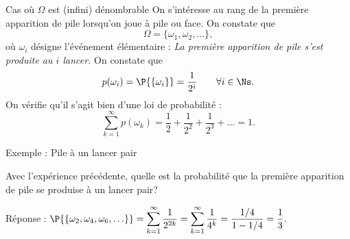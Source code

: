 \documentclass[nuit,charter,pied,handout]{BeamerJS}
\begin{document}
\begin{frame}{Cas où \(\Omega\) est (infini) dénombrable}
	\pause
	On s'intéresse au rang de la première apparition de pile lorsqu'on joue à pile ou face. On constate que
	\[\Omega=\{\omega_1,\omega_2,\ldots\},\]
	où \(\omega_i\) désigne l'événement élémentaire : \textit{La première apparition de pile s'est produite au \(i\) lancer.} \pause
	On constate que
	\[p(\omega_i)=\P{\{\omega_i\}}=\frac{1}{2^i}\qquad \forall i\in\Ns.\] \pause
	On vérifie qu'il s'agit bien d'une loi de probabilité :
	\[\sum_{k=1}^{\infty}p(\omega_k)=\frac{1}{2}+\frac{1}{2^2}+\frac{1}{2^3}+\ldots=1.\]
\end{frame}
\begin{frame}{Exemple : Pile à un lancer pair}
	\begin{cadre}
		Avec l'expérience précédente, quelle est la probabilité que la première apparition de pile se produise à un lancer pair?
	\end{cadre}
	\pause
	{\color{Dominante}Réponse : \(\displaystyle\P{\{\omega_2,\omega_4,\omega_6,\ldots\}}=\sum_{k=1}^{\infty}\frac{1}{2^{2k}}=\sum_{k=1}^{\infty}\frac{1}{4^{k}}=\frac{1/4}{1-1/4}=\frac{1}{3}.\)}
\end{frame}
\end{document}

